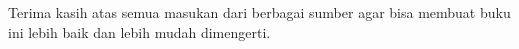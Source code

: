 Terima kasih atas semua masukan dari berbagai sumber agar bisa membuat buku ini 
lebih baik dan lebih mudah dimengerti.

